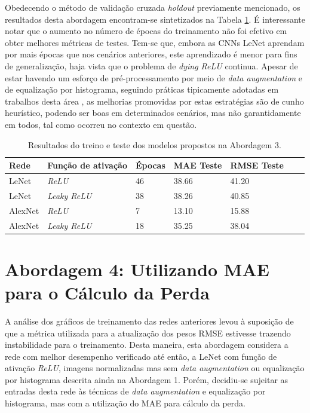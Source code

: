 	Obedecendo o método de validação cruzada \emph{holdout} previamente mencionado, os resultados desta abordagem encontram-se sintetizados na Tabela \ref{tab:results-3}. É interessante notar que o aumento no número de épocas do treinamento não foi efetivo em obter melhores métricas de testes. Tem-se que, embora as CNNs LeNet aprendam por mais épocas que nos cenários anteriores, este aprendizado é menor para fins de generalização, haja vista que o problema de \emph{dying ReLU} continua. Apesar de estar havendo um esforço de pré-processamento por meio de \emph{data augmentation} e de equalização por histograma, seguindo práticas tipicamente adotadas em trabalhos desta área \cite{chollet2017deep}, as melhorias promovidas por estas estratégias são de cunho heurístico, podendo ser boas em determinados cenários, mas não garantidamente em todos, tal como ocorreu no contexto em questão.

	\begin{table}[!ht]
		\caption{Resultados do treino e teste dos modelos propostos na Abordagem 3.}
		\label{tab:results-3}
		\centering
		\begin{tabular}{l l l l l l l}
				\toprule
				Rede & Função de ativação & Épocas & MAE Teste & RMSE Teste \\
				\midrule
				LeNet & \emph{ReLU} & 46 &  38.66 & 41.20 \\
				LeNet & \emph{Leaky ReLU} &  38 & 38.26 & 40.85 \\
				AlexNet & \emph{ReLU} & 7 & 13.10 & 15.88 \\
				AlexNet & \emph{Leaky ReLU} & 18 & 35.25 & 38.04 \\
				\bottomrule
			\end{tabular}
	\end{table}

\section{Abordagem 4: Utilizando MAE para o Cálculo da Perda}%
	A análise dos gráficos de treinamento das redes anteriores levou à suposição de que a métrica utilizada para a atualização dos pesos RMSE estivesse trazendo instabilidade para o treinamento. Desta maneira, esta abordagem considera a rede com melhor desempenho verificado até então, a LeNet com função de ativação \emph{ReLU}, imagens normalizadas mas sem \emph{data augmentation} ou equalização por histograma descrita ainda na Abordagem 1. Porém, decidiu-se sujeitar as entradas desta rede às técnicas de \emph{data augmentation} e equalização por histograma, mas com a utilização do MAE para cálculo da perda.

